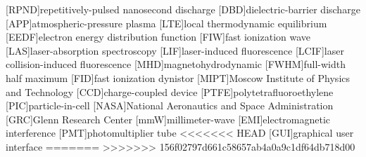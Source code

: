 [RPND]{repetitively-pulsed nanosecond discharge}
[DBD]{dielectric-barrier discharge}
[APP]{atmospheric-pressure plasma}
[LTE]{local thermodynamic equilibrium}
[EEDF]{electron energy distribution function}
[FIW]{fast ionization wave}
[LAS]{laser-absorption spectroscopy}
[LIF]{laser-induced fluorescence}
[LCIF]{laser collision-induced fluorescence}
[MHD]{magnetohydrodynamic}
[FWHM]{full-width half maximum}
[FID]{fast ionization dynistor}
[MIPT]{Moscow Institute of Physics and Technology}
[CCD]{charge-coupled device}
[PTFE]{polytetrafluoroethylene}
[PIC]{particle-in-cell}
[NASA]{National Aeronautics and Space Administration}
[GRC]{Glenn Research Center}
[mmW]{millimeter-wave}
[EMI]{electromagnetic interference}
[PMT]{photomultiplier tube}
<<<<<<< HEAD
[GUI]{graphical user interface}
=======
>>>>>>> 156f02797d661c58657ab4a0a9c1df64db718d00

